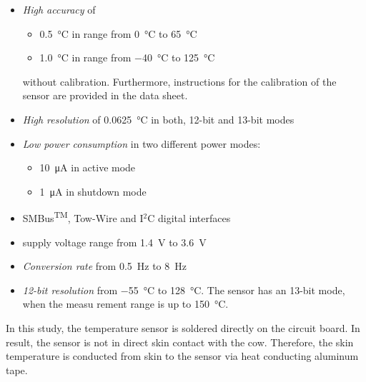 \documentclass[english,12pt,a4paper,pdftex,elec,utf8]{aaltothesis}
\begin{document}
\begin{itemize}
\item \textit{High accuracy} of 

\begin{itemize}
\item \SI{0.5}{\celsius} in range from \SI{0}{\celsius} to \SI{65}{\celsius}

\item \SI{1.0}{\celsius} in range from \SI{-40}{\celsius} to \SI{125}{\celsius}
\end{itemize} 

without calibration. Furthermore, instructions for the calibration of the sensor are provided in the data sheet. 

\item \textit{High resolution} of \SI{0.0625}{\celsius} in both, 12-bit and 13-bit modes

\item \textit{Low power consumption} in two different power modes:
\begin{itemize}
\item \SI{10}{\micro \ampere} in active mode
\item \SI{1}{\micro \ampere} in shutdown mode
\end{itemize}

\item SMBus\textsuperscript{TM}, Tow-Wire and I$^2$C digital interfaces

\item supply voltage range from \SI{1.4}{\volt} to \SI{3.6}{\volt}

\item \textit{Conversion rate} from \SI{0.5}{\hertz}  to \SI{8}{\hertz}

\item \textit{12-bit resolution} from \SI{-55}{\celsius} to \SI{128}{\celsius}. The sensor has an 13-bit mode, when the measu
rement range is up to \SI{150}{\celsius}. \cite{tmp112datasheet}
\end{itemize} In this study, the temperature sensor is soldered directly on the circuit board. In result, the sensor is not in direct skin contact with the cow. Therefore, the skin temperature is conducted from skin to the sensor via heat conducting aluminum tape.

\end{document}
